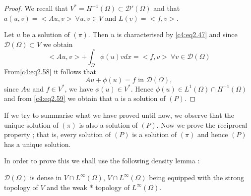   \begin{proof}
We recall that $V^* = H^{-1} (\Omega) \subset \mathscr{D}' (\Omega)$ and that $a (u, v) = <Au, v> \ \forall u, v \in V$ and $L (v) = <f, v>$.
  
  Let $u$ be a solution of $(\pi)$. Then $u$ is characterised by
  \eqref{c4:eq2.47} and since $\mathscr{D} (\Omega) \subset V$ we
  obtain 
  \begin{equation}
<Au, v> + \int_\Omega \phi (u) v dx = <f, v> \ \forall v \in \mathscr{D} (\Omega) \tag{2.58}\label{c4:eq2.58}
  \end{equation}  
 From\pageoriginale  \eqref{c4:eq2.58} it follows that
\begin{equation}
Au + \phi (u) = f \text{ in } \mathscr{D}(\Omega), \tag{2.59}\label{c4:eq2.59}
\end{equation}
since $Au$ and $f \in V^*$, we have $\phi (u) \in V^*$. Hence $\phi (u) \in L^1(\Omega) \cap H^{-1}(\Omega)$ and from \eqref{c4:eq2.59} we obtain that $u$ is a solution of $(P)$.
 \end{proof}  
 
If we try to summarise what we have proved until now, we observe that the unique solution of $(\pi)$ is also a solution of $(P)$. Now we prove the reciprocal property ; that is, every solution of $(P)$ is a solution of $(\pi)$ and hence $(P)$ has a unique solution.

In order to prove this we shall use the following density lemma : 

\begin{lemma}\label{c4:lem2.5}%
$\mathscr{D}(\Omega)$ is dense in $V \cap L^\infty (\Omega)$, $V \cap L^\infty (\Omega)$ being equipped with the strong topology of $V$ and the weak * topology of $L^\infty (\Omega)$.
\end{lemma}

